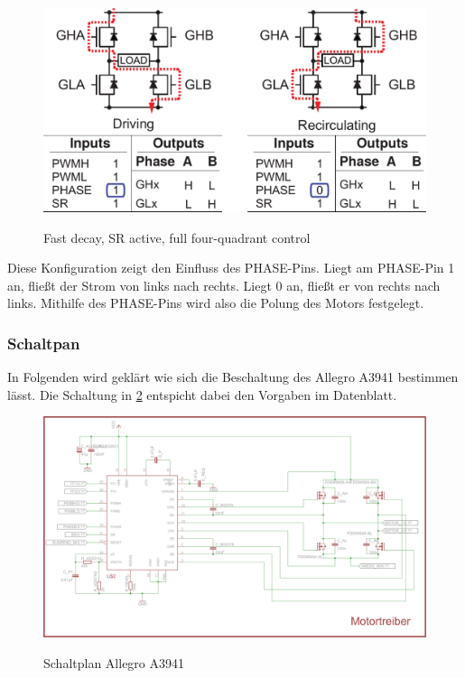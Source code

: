 \begin{figure}[H]
\centering
\includegraphics[width=.8\textwidth]{3941_5.png}\\
\caption{Fast decay, SR active, full four-quadrant control \cite{ds-A3941}}%
\label{fig:39415}
\end{figure}

Diese Konfiguration zeigt den Einfluss des PHASE-Pins. Liegt am PHASE-Pin 1 an,
fließt der Strom von links nach rechts. Liegt 0 an, fließt er von rechts nach links.
Mithilfe des PHASE-Pins wird also die Polung des Motors festgelegt.


\subsubsection{Schaltpan}

In Folgenden wird geklärt wie sich die Beschaltung des Allegro A3941 bestimmen lässt. Die Schaltung in \cref{fig:schalt:allegro} entspicht dabei den Vorgaben im Datenblatt.

\begin{figure}[H]
\centering
\includegraphics[width=\textwidth]{motortreiber.png}\\
\caption{Schaltplan Allegro A3941}%
\label{fig:schalt:allegro}
\end{figure}

